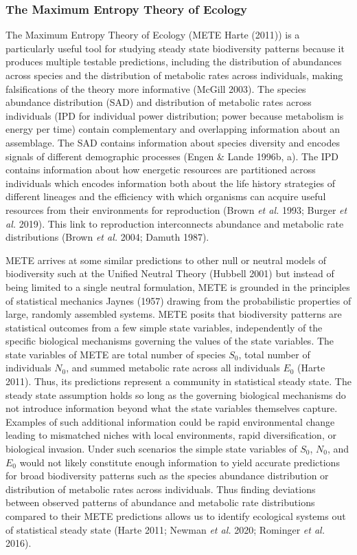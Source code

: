 \documentclass[
  letterpaper,
  DIV=11,
  numbers=noendperiod]{scrartcl}
\begin{document}
\subsubsection{The Maximum Entropy Theory of
Ecology}\label{the-maximum-entropy-theory-of-ecology}

The Maximum Entropy Theory of Ecology (METE Harte (2011)) is a
particularly useful tool for studying steady state biodiversity patterns
because it produces multiple testable predictions, including the
distribution of abundances across species and the distribution of
metabolic rates across individuals, making falsifications of the theory
more informative (McGill 2003). The species abundance distribution (SAD)
and distribution of metabolic rates across individuals (IPD for
individual power distribution; power because metabolism is energy per
time) contain complementary and overlapping information about an
assemblage. The SAD contains information about species diversity and
encodes signals of different demographic processes (Engen \& Lande
1996b, a). The IPD contains information about how energetic resources
are partitioned across individuals which encodes information both about
the life history strategies of different lineages and the efficiency
with which organisms can acquire useful resources from their
environments for reproduction (Brown \emph{et al.} 1993; Burger \emph{et
al.} 2019). This link to reproduction interconnects abundance and
metabolic rate distributions (Brown \emph{et al.} 2004; Damuth 1987).

METE arrives at some similar predictions to other null or neutral models
of biodiversity such at the Unified Neutral Theory (Hubbell 2001) but
instead of being limited to a single neutral formulation, METE is
grounded in the principles of statistical mechanics Jaynes (1957)
drawing from the probabilistic properties of large, randomly assembled
systems. METE posits that biodiversity patterns are statistical outcomes
from a few simple state variables, independently of the specific
biological mechanisms governing the values of the state variables. The
state variables of METE are total number of species \(S_0\), total
number of individuals \(N_0\), and summed metabolic rate across all
individuals \(E_0\) (Harte 2011). Thus, its predictions represent a
community in statistical steady state. The steady state assumption holds
so long as the governing biological mechanisms do not introduce
information beyond what the state variables themselves capture. Examples
of such additional information could be rapid environmental change
leading to mismatched niches with local environments, rapid
diversification, or biological invasion. Under such scenarios the simple
state variables of \(S_0\), \(N_0\), and \(E_0\) would not likely
constitute enough information to yield accurate predictions for broad
biodiversity patterns such as the species abundance distribution or
distribution of metabolic rates across individuals. Thus finding
deviations between observed patterns of abundance and metabolic rate
distributions compared to their METE predictions allows us to identify
ecological systems out of statistical steady state (Harte 2011; Newman
\emph{et al.} 2020; Rominger \emph{et al.} 2016).
\end{document}
